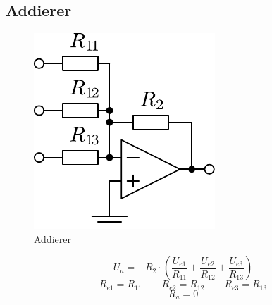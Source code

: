 



\subsection{Addierer}
\begin{figure}[h!]
	\centering
	\includegraphics[scale=\schscale]{../fig/op_add.pdf}
	\caption{Addierer}
	\label{sch:op-add}
\end{figure}
\[ U_a = - R_2 \cdot \left( \frac{U_{e1}}{R_{11}} + \frac{U_{e2}}{R_{12}} 
+ \frac{U_{e3}}{R_{13}} \right) \]
\[ R_{e1} = R_{11} \qquad R_{e2} = R_{12} \qquad R_{e3} = R_{13} \]
\[ R_a = 0 \]
